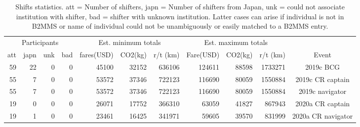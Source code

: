 \begin{table}[htp] 
\setlength{\tabcolsep}{2pt} 
\begin{center} 
\begin{tabular}{|rrrr| rrr| rrr| c|} 
\hline 
\multicolumn{4}{|c|}{Participants} & \multicolumn{3}{c|}{Est. minimum totals} & \multicolumn{3}{c|}{Est. maximum totals} & \\ 
 att&japn& unk& bad&fares(USD)&   CO2(kg)&  r/t (km)& Fare(USD)&   CO2(kg)&  r/t (km)&Event \\ 
\hline 
  59&  22&   0&   0&     45100&     32152&    636106&    124611&     88598&   1733271&2019c BCG \\ 
  55&   7&   0&   0&     53572&     37346&    722123&    116690&     80059&   1550884&2019c CR captain \\ 
  55&   7&   0&   0&     53572&     37346&    722123&    116690&     80059&   1550884&2019c navigator \\ 
  19&   0&   0&   0&     26071&     17752&    366310&     63059&     41827&    867943&2020a CR captain \\ 
  19&   1&   0&   0&     23461&     16425&    341971&     59605&     39570&    831999&2020a CR navigator \\ 
\hline 
\end{tabular} 
\label{tab:Shifts} 
\caption{Shifts statistics. att = Number of shifters, japn = Number of shifters from Japan, unk = could not associate institution with shifter, bad = shifter with unknown institution. Latter cases can arise if individual is not in B2MMS or name of individual could not be unambiguously or easily matched to a B2MMS entry.} 
\end{center} 
\end{table} 
